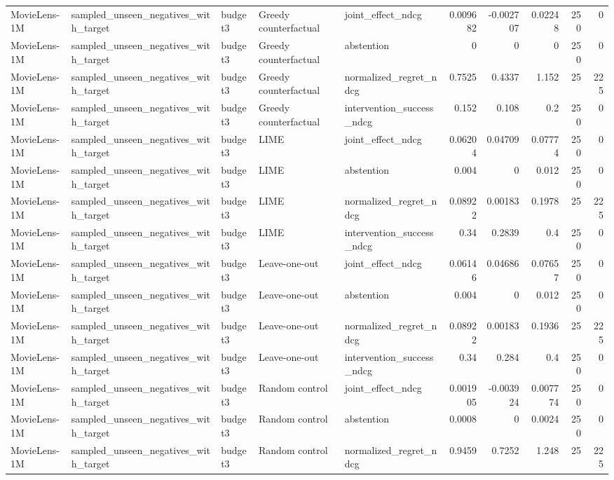 \begin{table}[t]
{\begin{tabular}{lllllrrrrr}
MovieLens-1M & sampled\_unseen\_negatives\_with\_target & budget3 & Greedy counterfactual & joint\_effect\_ndcg & 0.009682 & -0.002707 & 0.02248 & 250 & 0 \\
MovieLens-1M & sampled\_unseen\_negatives\_with\_target & budget3 & Greedy counterfactual & abstention & 0 & 0 & 0 & 250 & 0 \\
MovieLens-1M & sampled\_unseen\_negatives\_with\_target & budget3 & Greedy counterfactual & normalized\_regret\_ndcg & 0.7525 & 0.4337 & 1.152 & 25 & 225 \\
MovieLens-1M & sampled\_unseen\_negatives\_with\_target & budget3 & Greedy counterfactual & intervention\_success\_ndcg & 0.152 & 0.108 & 0.2 & 250 & 0 \\
MovieLens-1M & sampled\_unseen\_negatives\_with\_target & budget3 & LIME & joint\_effect\_ndcg & 0.06204 & 0.04709 & 0.07774 & 250 & 0 \\
MovieLens-1M & sampled\_unseen\_negatives\_with\_target & budget3 & LIME & abstention & 0.004 & 0 & 0.012 & 250 & 0 \\
MovieLens-1M & sampled\_unseen\_negatives\_with\_target & budget3 & LIME & normalized\_regret\_ndcg & 0.08922 & 0.00183 & 0.1978 & 25 & 225 \\
MovieLens-1M & sampled\_unseen\_negatives\_with\_target & budget3 & LIME & intervention\_success\_ndcg & 0.34 & 0.2839 & 0.4 & 250 & 0 \\
MovieLens-1M & sampled\_unseen\_negatives\_with\_target & budget3 & Leave-one-out & joint\_effect\_ndcg & 0.06146 & 0.04686 & 0.07657 & 250 & 0 \\
MovieLens-1M & sampled\_unseen\_negatives\_with\_target & budget3 & Leave-one-out & abstention & 0.004 & 0 & 0.012 & 250 & 0 \\
MovieLens-1M & sampled\_unseen\_negatives\_with\_target & budget3 & Leave-one-out & normalized\_regret\_ndcg & 0.08922 & 0.00183 & 0.1936 & 25 & 225 \\
MovieLens-1M & sampled\_unseen\_negatives\_with\_target & budget3 & Leave-one-out & intervention\_success\_ndcg & 0.34 & 0.284 & 0.4 & 250 & 0 \\
MovieLens-1M & sampled\_unseen\_negatives\_with\_target & budget3 & Random control & joint\_effect\_ndcg & 0.001905 & -0.003924 & 0.007774 & 250 & 0 \\
MovieLens-1M & sampled\_unseen\_negatives\_with\_target & budget3 & Random control & abstention & 0.0008 & 0 & 0.0024 & 250 & 0 \\
MovieLens-1M & sampled\_unseen\_negatives\_with\_target & budget3 & Random control & normalized\_regret\_ndcg & 0.9459 & 0.7252 & 1.248 & 25 & 225 \\

\end{tabular}}
\end{table}

